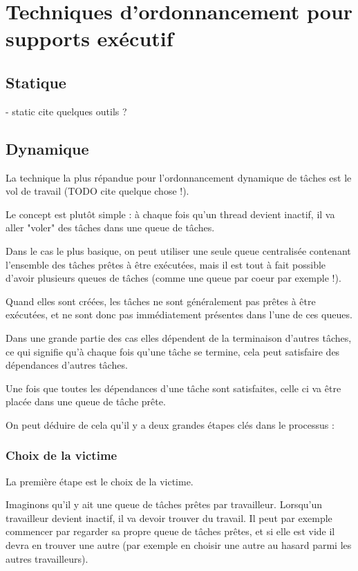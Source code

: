 \section{Techniques d'ordonnancement pour supports exécutif}\label{sec:context:runtimes}

\subsection{Statique}
 - static
 cite quelques outils ?

\subsection{Dynamique}

La technique la plus répandue pour l'ordonnancement dynamique de tâches est le vol de travail (TODO cite quelque chose !).

Le concept est plutôt simple : à chaque fois qu'un thread devient inactif, il va aller "voler" des tâches dans une queue de tâches.

Dans le cas le plus basique, on peut utiliser une seule queue centralisée contenant l'ensemble des tâches prêtes à être exécutées, mais il est tout à fait possible d'avoir plusieurs queues de tâches (comme une queue par coeur par exemple !).

Quand elles sont créées, les tâches ne sont généralement pas prêtes à être exécutées, et ne sont donc pas immédiatement présentes dans l'une de ces queues.

Dans une grande partie des cas elles dépendent de la terminaison d'autres tâches, ce qui signifie qu'à chaque fois qu'une tâche se termine, cela peut satisfaire des dépendances d'autres tâches.

Une fois que toutes les dépendances d'une tâche sont satisfaites, celle ci va être placée dans une queue de tâche prête.

On peut déduire de cela qu'il y a deux grandes étapes clés dans le processus :

\subsubsection{Choix de la victime}

La première étape est le choix de la victime.

Imaginons qu'il y ait une queue de tâches prêtes par travailleur.
Lorsqu'un travailleur devient inactif, il va devoir trouver du travail.
Il peut par exemple commencer par regarder sa propre queue de tâches prêtes, et si elle est vide il devra en trouver une autre (par exemple en choisir une autre au hasard parmi les autres travailleurs).

